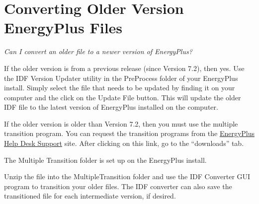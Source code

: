 \section{Converting Older Version EnergyPlus Files}\label{converting-older-version-energyplus-files}

\emph{Can I convert an older file to a newer version of EnergyPlus?}

If the older version is from a previous release (since Version 7.2), then yes.  Use the IDF Version Updater utility in the PreProcess folder of your EnergyPlus install.  Simply select the file that needs to be updated by finding it on your computer and the click on the Update File button. This will update the older IDF file to the latest version of EnergyPlus installed on the computer.

If the older version is older than Version 7.2, then you must use the multiple transition program. You can request the transition programs from the \href{https://energyplushelp.freshdesk.com/}{EnergyPlus Help Desk Support} site.  After clicking on this link, go to the ``downloads'' tab.

The Multiple Transition folder is set up on the EnergyPlus install.

Unzip the file into the MultipleTransition folder and use the IDF Converter GUI program to transition your older files. The IDF converter can also save the transitioned file for each intermediate version, if desired.
